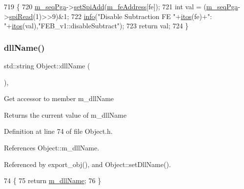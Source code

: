 \begin{DoxyCode}
719                                     \{
720   \hyperlink{classFEB__v1_a6c7804ac86796f233a8393043adf2e77}{m\_seqPga}->\hyperlink{classSeqPGA_ac998ce3a6d9b5f2e88cc8393f8c1df53}{setSpiAdd}(\hyperlink{classFEB__v1_a4e1945c2d5b434125f375e9d0fc6d99f}{m\_feAddress}[fe]);
721   \textcolor{keywordtype}{int} val = (\hyperlink{classFEB__v1_a6c7804ac86796f233a8393043adf2e77}{m\_seqPga}->\hyperlink{classSeqPGA_ab3d0e5e5d4014bc7a92588a76b8713d4}{spiRead}(1)>>9)&1;
722   \hyperlink{classObject_a644fd329ea4cb85f54fa6846484b84a8}{info}(\textcolor{stringliteral}{"Disable Subtraction FE "}+\hyperlink{Tools_8h_af330027dbdafb9a30768b3613c553e60}{itos}(fe)+\textcolor{stringliteral}{": "}+\hyperlink{Tools_8h_af330027dbdafb9a30768b3613c553e60}{itos}(val),\textcolor{stringliteral}{"FEB\_v1::disableSubtract"});
723   \textcolor{keywordflow}{return} val;
724 \}
\end{DoxyCode}
\mbox{\label{classObject_a2e3947f2870094c332d7454117f3ec63}} 
\subsubsection{\texorpdfstring{dll\+Name()}{dllName()}}
{\footnotesize\ttfamily std\+::string Object\+::dll\+Name (\begin{DoxyParamCaption}{ }\end{DoxyParamCaption})\hspace{0.3cm}{\ttfamily [inline]}, {\ttfamily [inherited]}}

Get accessor to member m\+\_\+dll\+Name \begin{DoxyReturn}{Returns}
the current value of m\+\_\+dll\+Name 
\end{DoxyReturn}


Definition at line 74 of file Object.\+h.



References Object\+::m\+\_\+dll\+Name.



Referenced by export\+\_\+obj(), and Object\+::set\+Dll\+Name().


\begin{DoxyCode}
74                        \{
75     \textcolor{keywordflow}{return} \hyperlink{classObject_a01afbeacebb8db6831559972ec362eb3}{m\_dllName};
76   \}  
\end{DoxyCode}
\mbox{\label{classFEB__v1_ac8186be2d5fd8122092d6475e77395e9}} 

